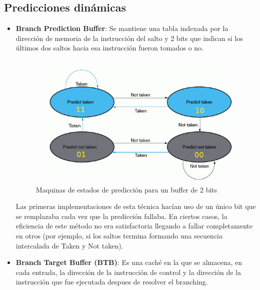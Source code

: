\subsection{Predicciones dinámicas}

\begin{itemize}
	\item\textbf{Branch Prediction Buffer}: Se mantiene una tabla indexada por la dirección de memoria de la instrucción del salto y 2 bits que indican si los últimos dos saltos hacia esa instrucción fueron tomados o no.
	
	\begin{figure}[ht]
		\centering
		\includegraphics[width=0.7\linewidth]{imagenes/2bit-buffer-prediction}
		\caption{Maquinas de estados de predicción para un buffer de 2 bits}
		\label{fig:2bit-buffer-prediction}
	\end{figure}

	Las primeras implementaciones de esta técnica hacían uso de un único bit que se remplazaba cada vez que la predicción fallaba. En ciertos casos, la eficiencia de este método no era satisfactoria llegando a fallar completamente en otros (por ejemplo, si los saltos termina formando una secuencia intercalada de Taken y Not taken).
	
	\item \textbf{Branch Target Buffer (BTB)}: Es una caché en la que se almacena, en cada entrada, la dirección de la instrucción de control y la dirección de la instrucción que fue ejecutada despues de resolver el branching.
	

\end{itemize}

